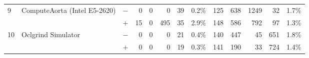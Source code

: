 \begin{tabular}{lll | rrrrr | rrrrr }
\hline
\multirow{ 2}{*}{9} & \multirow{ 2}{*}{ComputeAorta (Intel E5-2620)} & $-$ & 0 & 0 & 0 & 39 & 0.2\%       & 125 & 638 & 1249 & 32 & 1.7\% \\& & $+$ & 15 & 0 & 495 & 35 & 2.9\% & 148 & 586 & 792 & 97 & 1.3\% \\
\hline
\multirow{ 2}{*}{10} & \multirow{ 2}{*}{Oclgrind Simulator} & $-$ & 0 & 0 & 0 & 21 & 0.4\%       & 140 & 447 & 45 & 651 & 1.8\% \\& & $+$ & 0 & 0 & 0 & 19 & 0.3\% & 141 & 190 & 33 & 724 & 1.4\% \\
  \bottomrule
\end{tabular}


